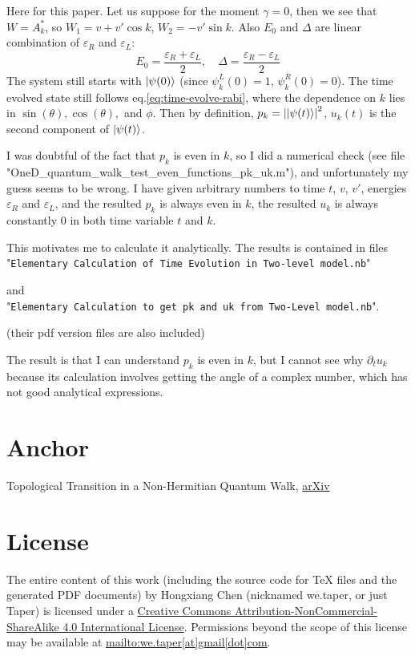 \documentclass{article}
\begin{document}
Here for this paper. Let us suppose for the moment $\gamma=0$, then we
see that $W=A_k^*$, so $W_1 = v+v'\cos{k}$, $W_2=-v'\sin{k}$. 
Also $E_0$ and $\Delta$ are linear combination of
$\varepsilon_R$ and $\varepsilon_L$:
\begin{equation}
    E_0 =\frac{\varepsilon_R+\varepsilon_L}{2},\quad
    \Delta =\frac{\varepsilon_R-\varepsilon_L}{2}
\end{equation}
The system still starts with
$\ket{\psi(0)}$ (since $\psi^L_k(0)=1,\,\psi^R_k(0)=0$). The time
evolved state still follows eq.\ref{eq:time-evolve-rabi}, where the
dependence on $k$ lies in $\sin(\theta),\cos(\theta),$ and $\phi$.
Then by definition, $p_k=\abs{\ket{\psi(t)}}^2$, $u_k(t)$ is the second
component of $\ket{\psi(t)}$.

I was doubtful of the fact that $p_k$ is even in $k$, so I did a
numerical check (see file
"{OneD\_quantum\_walk\_test\_even\_functions\_pk\_uk.m}"), and
unfortunately my guess seems to be wrong. I have given arbitrary
numbers to time $t$, $v$, $v'$, energies $\varepsilon_R$ and
$\varepsilon_L$, and the resulted $p_k$ is always even in $k$, the
resulted $u_k$ is always constantly $0$ in both time variable $t$ and $k$.

This motivates me to calculate it analytically. The results is
contained in files \\
"\texttt{Elementary Calculation of Time Evolution in Two-level model.nb}"

and\\
"\texttt{Elementary Calculation to get pk and uk from Two-Level
model.nb}".

(their pdf version files are also included) 

The result is that I can understand $p_k$ is even in $k$, but I cannot
see why $\partial_t u_k$ because its calculation involves getting the
angle of a complex number, which has not good analytical expressions.

\section{Anchor}
\label{sec:Anchor}

\begin{thebibliography}{1}
     Topological Transition in a Non-Hermitian Quantum
    Walk,
    \href{https://arxiv.org/ct?url=http%3A%2F%2Fdx.doi.org%2F10%252E1103%2FPhysRevLett%252E102%252E065703&v=f6968ad6}{arXiv}
\end{thebibliography}
\printnomenclature
\section{License}
The entire content of this work (including the source code
for TeX files and the generated PDF documents) by 
Hongxiang Chen (nicknamed we.taper, or just Taper) is
licensed under a 
\href{http://creativecommons.org/licenses/by-nc-sa/4.0/}{Creative 
Commons Attribution-NonCommercial-ShareAlike 4.0 International 
License}. Permissions beyond the scope of this 
license may be available at \url{mailto:we.taper[at]gmail[dot]com}.
\end{document}
